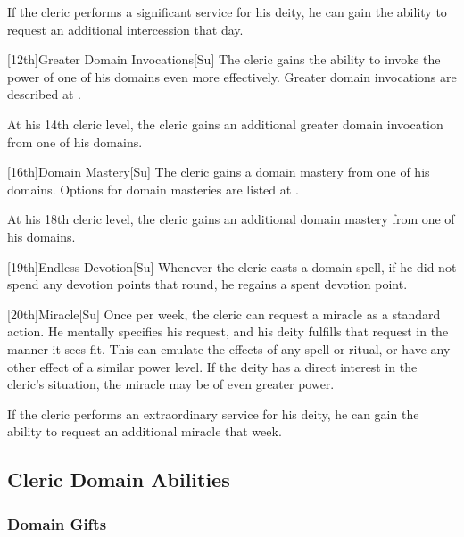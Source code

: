        If the cleric performs a significant service for his deity, he can gain the ability to request an additional intercession that day.

        [12th]{Greater Domain Invocations}[Su]
        The cleric gains the ability to invoke the power of one of his domains even more effectively.
        Greater domain invocations are described at .

        At his 14th cleric level, the cleric gains an additional greater domain invocation from one of his domains.

        [16th]{Domain Mastery}[Su]
        The cleric gains a domain mastery from one of his domains.
        Options for domain masteries are listed at .

        At his 18th cleric level, the cleric gains an additional domain mastery from one of his domains.

        [19th]{Endless Devotion}[Su]
        Whenever the cleric casts a domain spell, if he did not spend any devotion points that round, he regains a spent devotion point.

        [20th]{Miracle}[Su]
        Once per week, the cleric can request a miracle as a standard action.
        He mentally specifies his request, and his deity fulfills that request in the manner it sees fit.
        This can emulate the effects of any spell or ritual, or have any other effect of a similar power level.
        If the deity has a direct interest in the cleric's situation, the miracle may be of even greater power.

        If the cleric performs an extraordinary service for his deity, he can gain the ability to request an additional miracle that week.

    \subsection{Cleric Domain Abilities}

        \subsubsection{Domain Gifts}\label{Domain Gifts}

